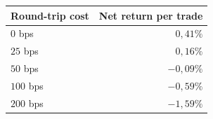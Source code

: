 {\footnotesize\setlength{\tabcolsep}{4pt}
\begin{tabular}{lr}
\toprule
Round-trip cost & Net return per trade \\
\midrule
$0$ bps & $0{,}41\%$ \\
$25$ bps & $0{,}16\%$ \\
$50$ bps & $-0{,}09\%$ \\
$100$ bps & $-0{,}59\%$ \\
$200$ bps & $-1{,}59\%$ \\
\bottomrule
\end{tabular}}
